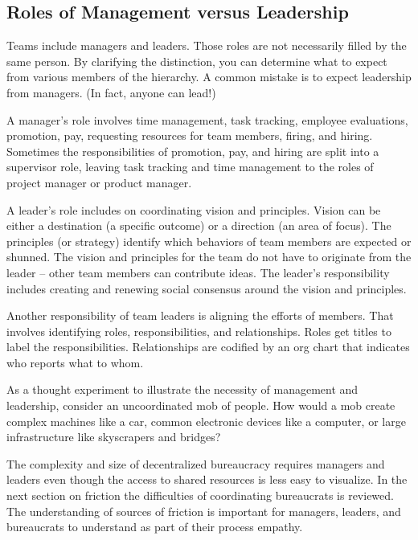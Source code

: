 

\subsection*{Roles of Management versus Leadership}

Teams include managers and leaders. Those roles are not necessarily filled by the same person. By clarifying the distinction, you can determine what to expect from various members of the hierarchy. A common mistake is to expect leadership from managers. (In fact, anyone can lead!)

A manager's role involves time management, task tracking, employee evaluations, promotion, pay, requesting resources for team members, firing, and hiring. Sometimes the responsibilities of promotion, pay, and hiring are split into a supervisor role, leaving task tracking and time management to the roles of project manager or product manager.

A leader's role includes on coordinating vision and principles. Vision can be either a destination (a specific outcome) or a direction (an area of focus). The principles (or strategy) identify which behaviors of team members are expected or shunned. The vision and principles for the team do not have to originate from the leader -- other team members can contribute ideas. The leader's responsibility includes creating and renewing social consensus around the vision and principles. 

Another responsibility of team leaders is aligning the efforts of members. That involves identifying roles, responsibilities, and relationships. Roles get titles to label the responsibilities. Relationships are codified by an \gls{org chart} that indicates who reports what to whom. 

As a thought experiment to illustrate the necessity of management and leadership, consider an uncoordinated mob of people. How would a mob create complex machines like a car, common electronic devices like a computer, or large infrastructure like skyscrapers and bridges?

The complexity and size of \gls{decentralized bureaucracy} requires managers and leaders even though the access to shared resources is less easy to visualize. In the next section on friction the difficulties of coordinating bureaucrats is reviewed. The understanding of sources of friction is important for managers, leaders, and bureaucrats to understand as part of their process empathy.


